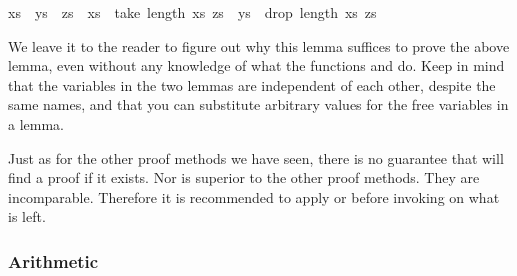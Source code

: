 \begin{isabellebody}
\begin{isamarkuptext}
\begin{isabelle}
{}xs\ {}\ ys\ {}\ zs{}\ {}\ {}xs\ {}\ take\ {}length\ xs{}\ zs\ {}\ ys\ {}\ drop\ {}length\ xs{}\ zs{}%
\end{isabelle}
We leave it to the reader to figure out why this lemma suffices to prove
the above lemma, even without any knowledge of what the functions 
and  do. Keep in mind that the variables in the two lemmas
are independent of each other, despite the same names, and that you can
substitute arbitrary values for the free variables in a lemma.

Just as for the other proof methods we have seen, there is no guarantee that
 will find a proof if it exists. Nor is
 superior to the other proof methods.  They are
incomparable. Therefore it is recommended to apply  or  before invoking  on what is left.

\subsubsection{Arithmetic}


\end{isamarkuptext}
\end{isabellebody}
